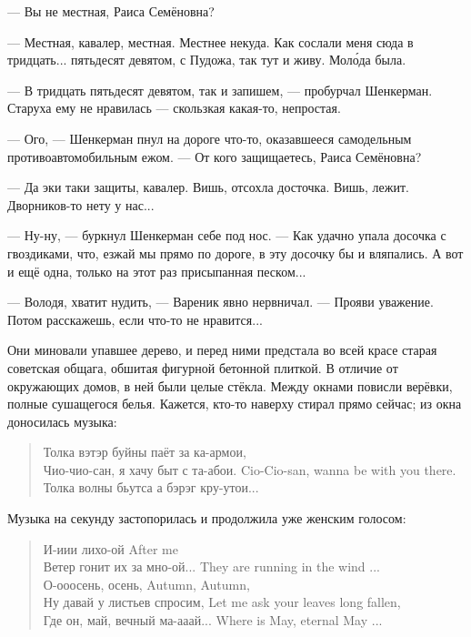 --- Вы не местная, Раиса Семёновна?

--- Местная, кавалер, местная.
Местнее некуда.
Как сослали меня сюда в тридцать... пятьдесят девятом, с Пудожа, так тут и живу.
Мол\'ода была.

--- В тридцать пятьдесят девятом, так и запишем, --- пробурчал Шенкерман.
Старуха ему не нравилась --- скользкая какая-то, непростая.

--- Ого, --- Шенкерман пнул на дороге что-то, оказавшееся самодельным противоавтомобильным ежом.
--- От кого защищаетесь, Раиса Семёновна?

--- Да эки таки защиты, кавалер.
Вишь, отсохла досточка.
Вишь, лежит.
Дворников-то нету у нас...

--- Ну-ну, --- буркнул Шенкерман себе под нос.
--- Как удачно упала досочка с гвоздиками, что, езжай мы прямо по дороге, в эту досочку бы и вляпались.
А вот и ещё одна, только на этот раз присыпанная песком...

--- Володя, хватит нудить, --- Вареник явно нервничал.
--- Прояви уважение.
Потом расскажешь, если что-то не нравится...

Они миновали упавшее дерево, и перед ними предстала во всей красе старая советская общага, обшитая фигурной бетонной плиткой.
В отличие от окружающих домов, в ней были целые стёкла.
Между окнами повисли верёвки, полные сушащегося белья.
Кажется, кто-то наверху стирал прямо сейчас;
из окна доносилась музыка:

\begin{quote}
Толка вэтэр буйны паёт за ка-армои,\\
{Чио-чио-сан, я хачу быт с та-абои.}
{Cio-Cio-san, wanna be with you there.}\\
Толка волны бьутса а бэрэг кру-утои...
\end{quote}

Музыка на секунду застопорилась и продолжила уже женским голосом:

\begin{quote}
{И-иии лихо-ой}
{After me}\\
{Ветер гонит их за мно-ой...}
{They are running in the wind ...}\\
{О-ооосень, осень,}
{Autumn, Autumn,}\\
{Ну давай у листьев спросим,}
{Let me ask your leaves long fallen,}\\
{Где он, май, вечный ма-ааай...}
{Where is May, eternal May ...}
\end{quote}

